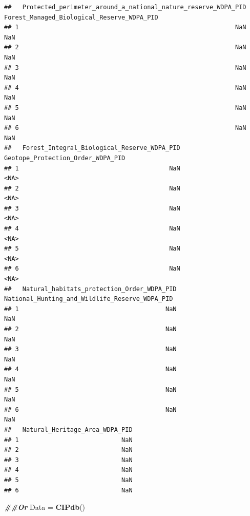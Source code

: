 \documentclass[
]{article}
\newenvironment{Shaded}{\begin{snugshade}}{\end{snugshade}}
\newcommand{\DocumentationTok}[1]{\textcolor[rgb]{0.56,0.35,0.01}{\textbf{\textit{#1}}}}
\newcommand{\FunctionTok}[1]{\textcolor[rgb]{0.13,0.29,0.53}{\textbf{#1}}}
\newcommand{\NormalTok}[1]{#1}
\newcommand{\OtherTok}[1]{\textcolor[rgb]{0.56,0.35,0.01}{#1}}
\begin{document}
\begin{verbatim}
##   Protected_perimeter_around_a_national_nature_reserve_WDPA_PID Forest_Managed_Biological_Reserve_WDPA_PID
## 1                                                           NaN                                        NaN
## 2                                                           NaN                                        NaN
## 3                                                           NaN                                        NaN
## 4                                                           NaN                                        NaN
## 5                                                           NaN                                        NaN
## 6                                                           NaN                                        NaN
##   Forest_Integral_Biological_Reserve_WDPA_PID Geotope_Protection_Order_WDPA_PID
## 1                                         NaN                              <NA>
## 2                                         NaN                              <NA>
## 3                                         NaN                              <NA>
## 4                                         NaN                              <NA>
## 5                                         NaN                              <NA>
## 6                                         NaN                              <NA>
##   Natural_habitats_protection_Order_WDPA_PID National_Hunting_and_Wildlife_Reserve_WDPA_PID
## 1                                        NaN                                            NaN
## 2                                        NaN                                            NaN
## 3                                        NaN                                            NaN
## 4                                        NaN                                            NaN
## 5                                        NaN                                            NaN
## 6                                        NaN                                            NaN
##   Natural_Heritage_Area_WDPA_PID
## 1                            NaN
## 2                            NaN
## 3                            NaN
## 4                            NaN
## 5                            NaN
## 6                            NaN
\end{verbatim}

\begin{Shaded}
\begin{Highlighting}[]
\DocumentationTok{\#\#Or}
\NormalTok{Data }\OtherTok{=} \FunctionTok{CIPdb}\NormalTok{()}
\end{Highlighting}
\end{Shaded}
\end{document}
